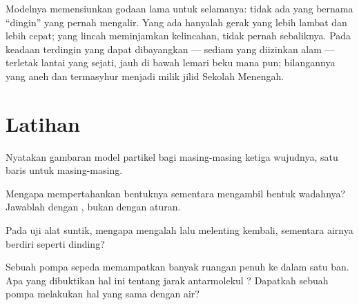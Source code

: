 \begin{example}\label{ex:g7:states-of-matter:cold}
Modelnya memensiunkan godaan lama untuk selamanya: tidak ada yang
bernama ``dingin'' yang pernah mengalir. Yang ada hanyalah gerak
 yang lebih lambat dan lebih cepat; yang lincah meminjamkan
kelincahan, tidak pernah sebaliknya. Pada keadaan terdingin yang dapat
dibayangkan ---  sediam yang diizinkan alam --- terletak lantai
 yang sejati, jauh di bawah lemari beku mana pun; bilangannya yang
aneh dan termasyhur menjadi milik jilid Sekolah Menengah.
\end{example}

\section{Latihan}

\begin{exercise}[$\star$]\label{exo:g7:states-of-matter:1}
Nyatakan gambaran model partikel bagi masing-masing ketiga wujudnya,
satu baris untuk masing-masing.
\end{exercise}

\begin{exercise}[$\star$]\label{exo:g7:states-of-matter:2}
Mengapa  mempertahankan bentuknya sementara 
mengambil bentuk wadahnya? Jawablah dengan , bukan dengan
aturan.
\end{exercise}

\begin{exercise}[$\star$]\label{exo:g7:states-of-matter:3}
Pada uji alat suntik, mengapa  mengalah lalu melenting
kembali, sementara airnya berdiri seperti dinding?
\end{exercise}

\begin{exercise}[$\star$]\label{exo:g7:states-of-matter:4}
Sebuah pompa sepeda memampatkan banyak ruangan penuh  ke dalam
satu ban. Apa yang dibuktikan hal ini tentang jarak antarmolekul ?
Dapatkah sebuah pompa melakukan hal yang sama dengan air?
\end{exercise}

